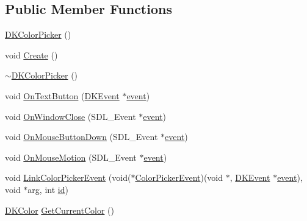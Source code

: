 \subsection*{Public Member Functions}
\begin{DoxyCompactItemize}
\item 
\hyperlink{class_d_k_color_picker_aacbb6d4a2aa1f9fb3ef19f21d28f2bc4}{D\-K\-Color\-Picker} ()
\item 
void \hyperlink{class_d_k_color_picker_ab052533e9c0da56e4daeab97a0c50a9e}{Create} ()
\item 
\hyperlink{class_d_k_color_picker_a80a5165afcc71278b1b53cdaae4ee673}{$\sim$\-D\-K\-Color\-Picker} ()
\item 
void \hyperlink{class_d_k_color_picker_acf46d3dd387795292807df1125bdca9e}{On\-Text\-Button} (\hyperlink{class_d_k_event}{D\-K\-Event} $\ast$\hyperlink{class_d_k_event_a3deebb932ed734363c4ece87971bc45f}{event})
\item 
void \hyperlink{class_d_k_color_picker_a6280c7eab9ab687ad049b92116a5c74e}{On\-Window\-Close} (S\-D\-L\-\_\-\-Event $\ast$\hyperlink{class_d_k_event_a3deebb932ed734363c4ece87971bc45f}{event})
\item 
void \hyperlink{class_d_k_color_picker_a3eb4d359074376e302943f239722a299}{On\-Mouse\-Button\-Down} (S\-D\-L\-\_\-\-Event $\ast$\hyperlink{class_d_k_event_a3deebb932ed734363c4ece87971bc45f}{event})
\item 
void \hyperlink{class_d_k_color_picker_ae05688bd9bac8f9872c584e01ba10dbd}{On\-Mouse\-Motion} (S\-D\-L\-\_\-\-Event $\ast$\hyperlink{class_d_k_event_a3deebb932ed734363c4ece87971bc45f}{event})
\item 
void \hyperlink{class_d_k_color_picker_a89ef83f5e94f291fd3c2e11e0e71feeb}{Link\-Color\-Picker\-Event} (void($\ast$\hyperlink{class_d_k_event_adffe2183781aba801fb8ec90370598bf}{Color\-Picker\-Event})(void $\ast$, \hyperlink{class_d_k_event}{D\-K\-Event} $\ast$\hyperlink{class_d_k_event_a3deebb932ed734363c4ece87971bc45f}{event}), void $\ast$arg, int \hyperlink{class_d_k_event_a46877918e12fcb3b2c8988379b6fa6fa}{id})
\item 
\hyperlink{class_d_k_color}{D\-K\-Color} \hyperlink{class_d_k_color_picker_a0ec7c73044dac4e52b567fc2f87cb216}{Get\-Current\-Color} ()
\end{DoxyCompactItemize}
